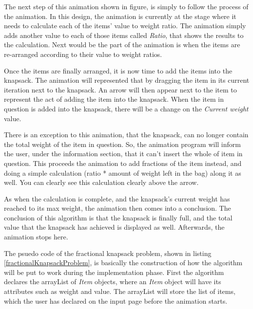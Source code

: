 The next step of this animation shown in figure, is simply to follow the process of the animation. In this design, the animation is currently at the stage where it needs to calculate each of the items' value to weight ratio. The animation simply adds another value to each of those items called \textit{Ratio}, that shows the results to the calculation. Next would be the part of the animation is when the items are re-arranged according to their value to weight ratios.

Once the items are finally arranged, it is now time to add the items into the knapsack. The animation will represented that by dragging the item in its current iteration next to the knapsack. An arrow will then appear next to the item to represent the act of adding the item into the knapsack. When the item in question is added into the knapsack, there will be a change on the \textit{Current weight} value. 

There is an exception to this animation, that the knapsack, can no longer contain the total weight of the item in question. So, the animation program will inform the user, under the information section, that it can't insert the whole of item in question. This proceeds the animation to add fractions of the item instead, and doing a simple calculation (ratio * amount of weight left in the bag) along it as well. You can clearly see this calculation clearly above the arrow.

As when the calculation is complete, and the knapsack's current weight has reached to its max weight, the animation then comes into a conclusion. The conclusion of this algorithm is that the knapsack is finally full, and the total value that the knapsack has achieved is displayed as well. Afterwards, the animation stops here. 

\newpage



The psuedo code of the fractional knapsack problem, shown in listing \ref{fractionalKnapsackProblem}, is basically the construction of how the algorithm will be put to work during the implementation phase. First the algorithm declares the arrayList of \textit{Item} objects, where an \textit{Item} object will have its attributes such as weight and value. The arrayList will store the list of items, which the user has declared on the input page before the animation starts.


